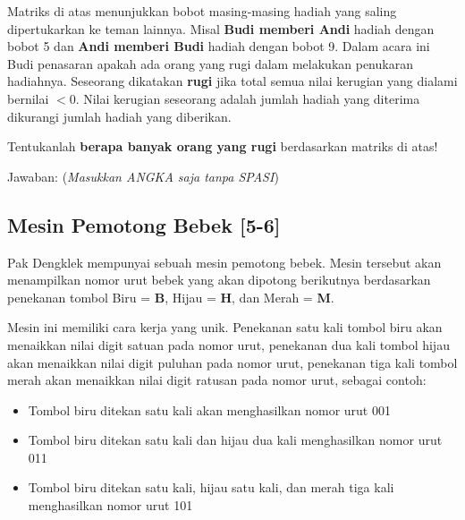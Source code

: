\documentclass[a4paper,11pt]{article}
\begin{document}
\begin{enumerate}
Matriks di atas menunjukkan bobot masing-masing hadiah yang saling dipertukarkan ke teman lainnya.  
Misal \textbf{Budi memberi Andi} hadiah dengan bobot 5 dan \textbf{Andi memberi Budi} hadiah dengan bobot 9.  
Dalam acara ini Budi penasaran apakah ada orang yang rugi dalam melakukan penukaran hadiahnya. Seseorang dikatakan \textbf{rugi} jika total semua nilai kerugian yang dialami bernilai $< 0$.  
Nilai kerugian seseorang adalah jumlah hadiah yang diterima dikurangi jumlah hadiah yang diberikan.

Tentukanlah \textbf{berapa banyak orang yang rugi} berdasarkan matriks di atas!  

Jawaban: \underline{\hspace{5cm}} \quad (\textit{Masukkan ANGKA saja tanpa SPASI})

\subsection*{Mesin Pemotong Bebek [5-6]}
Pak Dengklek mempunyai sebuah mesin pemotong bebek. Mesin tersebut akan menampilkan nomor urut bebek yang akan dipotong berikutnya berdasarkan penekanan tombol Biru = \textbf{B}, Hijau = \textbf{H}, dan Merah = \textbf{M}.

\begin{center}
\end{center}

Mesin ini memiliki cara kerja yang unik. Penekanan satu kali tombol biru akan menaikkan nilai digit satuan pada nomor urut, penekanan dua kali tombol hijau akan menaikkan nilai digit puluhan pada nomor urut, penekanan tiga kali tombol merah akan menaikkan nilai digit ratusan pada nomor urut, sebagai contoh:
\begin{itemize}
    \item Tombol biru ditekan satu kali akan menghasilkan nomor urut 001
    \item Tombol biru ditekan satu kali dan hijau dua kali menghasilkan nomor urut 011
    \item Tombol biru ditekan satu kali, hijau satu kali, dan merah tiga kali menghasilkan nomor urut 101
\end{itemize}


\end{enumerate}
\end{document}
